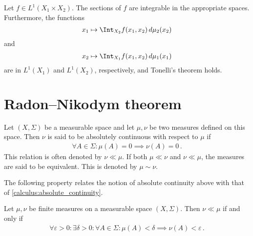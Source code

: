     \begin{result}[Fubini]
        Let $f\in L^1(X_1\times X_2)$. The sections of $f$ are integrable in the appropriate spaces. Furthermore, the functions
        \begin{gather}
            x_1\mapsto\Int_{X_2}f(x_1,x_2)\,d\mu_2(x_2)
        \end{gather}
        and
        \begin{gather}
            x_2\mapsto\Int_{X_1}f(x_1,x_2)\,d\mu_1(x_1)
        \end{gather}
        are in $L^1(X_1)$ and $L^1(X_2)$, respectively, and Tonelli's theorem holds.
    \end{result}

\section{Radon--Nikodym theorem}\label{section:Radon-Nikodym}

    \begin{definition}\label{measure:absolute_continuity}
        Let $(X,\Sigma)$ be a measurable space and let $\mu,\nu$ be two measures defined on this space. Then $\nu$ is said to be absolutely continuous with respect to $\mu$ if
        \begin{gather}
            \forall A\in\Sigma:\mu(A) = 0\implies\nu(A) = 0\,.
        \end{gather}
        This relation is often denoted by $\nu\ll\mu$. If both $\mu\ll\nu$ and $\nu\ll\mu$, the measures are said to be equivalent. This is denoted by $\mu\sim\nu$.
    \end{definition}

    The following property relates the notion of absolute continuity above with that of \cref{calculus:absolute_continuity}.
    \begin{property}
        Let $\mu,\nu$ be finite measures on a measurable space $(X,\Sigma)$. Then $\nu\ll\mu$ if and only if
        \begin{gather}
            \forall\varepsilon>0:\exists\delta>0:\forall A\in\Sigma:\mu(A)<\delta\implies\nu(A)<\varepsilon\,.
        \end{gather}
    \end{property}

